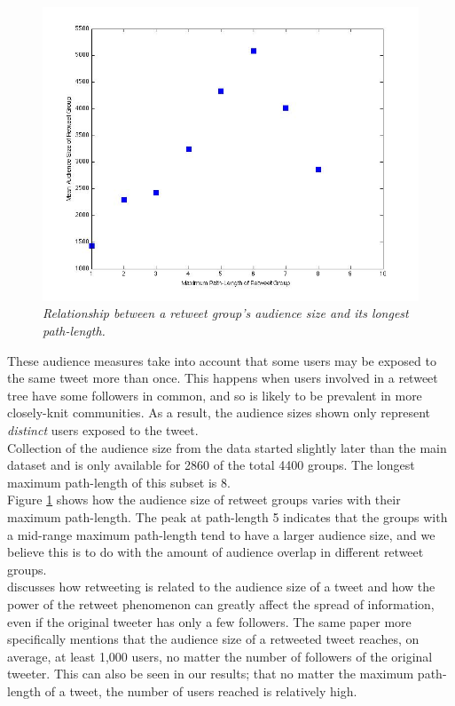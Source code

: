 \begin{figure}[h]
\includegraphics[scale=0.35]{3.Chapter1/Media/audience-pathlength.jpg} 
\caption{\textit{Relationship between a retweet group's audience size and its longest path-length.}}
\label{fig:pathlength-audience}
\end{figure}
These audience measures take into account that some users may be exposed to the same tweet more than once. This happens when users involved in a retweet tree have some followers in common, and so is likely to be prevalent in more closely-knit communities. As a result, the audience sizes shown only represent \textit{distinct} users exposed to the tweet.\\
Collection of the audience size from the data started slightly later than the main dataset and is only available for 2860 of the total 4400 groups. The longest maximum path-length of this subset is 8.\\
Figure \ref{fig:pathlength-audience} shows how the audience size of retweet groups varies with their maximum path-length. The peak at path-length 5 indicates that the groups with a mid-range maximum path-length tend to have a larger audience size, and we believe this is to do with the amount of audience overlap in different retweet groups.\\
\cite{kwak10} discusses how retweeting is related to the audience size of a tweet and how the power of the retweet phenomenon can greatly affect the spread of information, even if the original tweeter has only a few followers. The same paper more specifically mentions that the audience size of a retweeted tweet reaches, on average, at least 1,000 users, no matter the number of followers of the original tweeter. This can also be seen in our results; that no matter the maximum path-length of a tweet, the number of users reached is relatively high.\\
